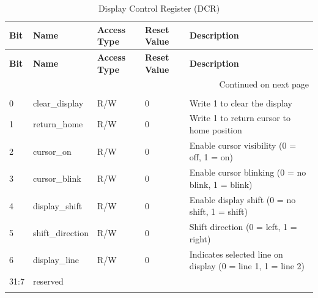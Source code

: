     \begin{longtable}{|p{1cm}|p{3cm}|p{2cm}|p{1cm}|p{6.25cm}|}
        \hline
        \textbf{Bit} & \textbf{Name} & \textbf{Access Type} & \textbf{Reset Value} & \textbf{Description} \\
        \hline
        \endfirsthead
        \hline
        \textbf{Bit} & \textbf{Name} & \textbf{Access Type} & \textbf{Reset Value} & \textbf{Description} \\
        \hline
        \endhead
        \hline \multicolumn{5}{|r|}{{Continued on next page}} \\ \hline
        \endfoot
        \hline
        \endlastfoot

        \multicolumn{5}{|c|}{\textbf{0x24 DCR - Display Control Register}} \\
        \hline
        0 & clear\_display & R/W & 0 & Write 1 to clear the display \\
        \hline
        1 & return\_home & R/W & 0 & Write 1 to return cursor to home position \\
        \hline
        2 & cursor\_on & R/W & 0 & Enable cursor visibility (0 = off, 1 = on) \\
        \hline
        3 & cursor\_blink & R/W & 0 & Enable cursor blinking (0 = no blink, 1 = blink) \\
        \hline
        4 & display\_shift & R/W & 0 & Enable display shift (0 = no shift, 1 = shift) \\
        \hline
        5 & shift\_direction & R/W & 0 & Shift direction (0 = left, 1 = right) \\
        \hline
        6 & display\_line & R/W & 0 & Indicates selected line on display (0 = line 1, 1 = line 2) \\
        \hline
        31:7 & reserved & & & \\
        \hline
        \caption{Display Control Register (DCR)}
        \label{tab:fmr}
        \end{longtable}

